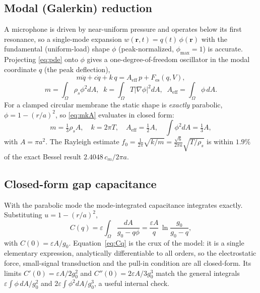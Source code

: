 \documentclass[conference]{IEEEtran}
\begin{document}
\subsection{Modal (Galerkin) reduction}
A microphone is driven by near-uniform pressure and operates below its first
resonance, so a single-mode expansion $w(\mathbf{r},t)=q(t)\,\phi(\mathbf{r})$
with the fundamental (uniform-load) shape $\phi$ (peak-normalized, $\phi_{\max}=1$)
is accurate. Projecting \eqref{eq:pde} onto $\phi$ gives a one-degree-of-freedom
oscillator in the modal coordinate $q$ (the peak deflection),
\begin{equation}
m\ddot q + c\dot q + k\,q = A_\mathrm{eff}\,p + F_\mathrm{es}(q,V),
\label{eq:modal}
\end{equation}
\begin{equation}
m=\!\int_\Omega\!\rho_s\phi^2 dA,\;\;
k=\!\int_\Omega\!T|\nabla\phi|^2 dA,\;\;
A_\mathrm{eff}=\!\int_\Omega\!\phi\,dA .
\label{eq:mkA}
\end{equation}
For a clamped circular membrane the static shape is \emph{exactly} parabolic,
$\phi=1-(r/a)^2$, so \eqref{eq:mkA} evaluates in closed form:
\begin{equation}
m=\tfrac{1}{3}\rho_s A,\quad k=2\pi T,\quad
A_\mathrm{eff}=\tfrac{1}{2}A,\quad \textstyle\int\phi^2 dA=\tfrac13 A,
\label{eq:closed}
\end{equation}
with $A=\pi a^2$. The Rayleigh estimate
$f_0=\tfrac{1}{2\pi}\sqrt{k/m}=\tfrac{\sqrt6}{2\pi a}\sqrt{T/\rho_s}$ is within
$1.9\%$ of the exact Bessel result $2.4048\,c_m/2\pi a$.

\subsection{Closed-form gap capacitance}
With the parabolic mode the mode-integrated capacitance integrates exactly.
Substituting $u=1-(r/a)^2$,
\begin{equation}
C(q)=\varepsilon\!\int_\Omega\!\frac{dA}{g_0-q\phi}
     =\frac{\varepsilon A}{q}\,\ln\!\frac{g_0}{g_0-q},
\label{eq:Cq}
\end{equation}
with $C(0)=\varepsilon A/g_0$. Equation~\eqref{eq:Cq} is the crux of the
model: it is a single elementary expression, analytically differentiable to all
orders, so the electrostatic force, small-signal transduction and the pull-in
condition are all closed-form. Its limits
$C'(0)=\varepsilon A/2g_0^2$ and $C''(0)=2\varepsilon A/3g_0^3$ match the general
integrals $\varepsilon\!\int\phi\,dA/g_0^2$ and
$2\varepsilon\!\int\phi^2 dA/g_0^3$, a useful internal check.
\end{document}
